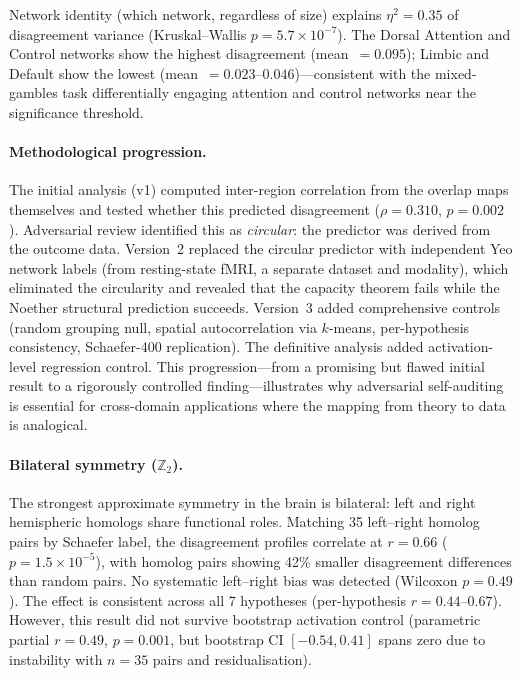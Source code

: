 \documentclass[11pt,a4paper]{article}
\begin{document}
Network identity (which network, regardless of size) explains $\eta^2 = 0.35$ of disagreement variance (Kruskal--Wallis $p = 5.7 \times 10^{-7}$).  The Dorsal Attention and Control networks show the highest disagreement (mean~$= 0.095$); Limbic and Default show the lowest (mean~$= 0.023$--$0.046$)---consistent with the mixed-gambles task differentially engaging attention and control networks near the significance threshold.

\paragraph{Methodological progression.}
The initial analysis (v1) computed inter-region correlation from the overlap maps themselves and tested whether this predicted disagreement ($\rho = 0.310$, $p = 0.002$).  Adversarial review identified this as \emph{circular}: the predictor was derived from the outcome data.  Version~2 replaced the circular predictor with independent Yeo network labels (from resting-state fMRI, a separate dataset and modality), which eliminated the circularity and revealed that the capacity theorem fails while the Noether structural prediction succeeds.  Version~3 added comprehensive controls (random grouping null, spatial autocorrelation via $k$-means, per-hypothesis consistency, Schaefer-400 replication).  The definitive analysis added activation-level regression control.  This progression---from a promising but flawed initial result to a rigorously controlled finding---illustrates why adversarial self-auditing is essential for cross-domain applications where the mapping from theory to data is analogical.

\paragraph{Bilateral symmetry ($\mathbb{Z}_2$).}
The strongest approximate symmetry in the brain is bilateral: left and right hemispheric homologs share functional roles.  Matching 35 left--right homolog pairs by Schaefer label, the disagreement profiles correlate at $r = 0.66$ ($p = 1.5 \times 10^{-5}$), with homolog pairs showing 42\% smaller disagreement differences than random pairs.  No systematic left--right bias was detected (Wilcoxon $p = 0.49$).  The effect is consistent across all 7 hypotheses (per-hypothesis $r = 0.44$--$0.67$).  However, this result did not survive bootstrap activation control (parametric partial $r = 0.49$, $p = 0.001$, but bootstrap CI $[-0.54, 0.41]$ spans zero due to instability with $n = 35$ pairs and residualisation).
\end{document}
